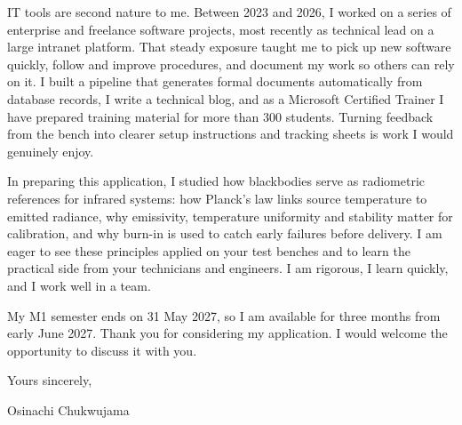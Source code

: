 \documentclass[11pt,a4paper]{article}
\begin{document}
IT tools are second nature to me. Between 2023 and 2026, I worked on a series of enterprise and freelance software projects, most recently as technical lead on a large intranet platform. That steady exposure taught me to pick up new software quickly, follow and improve procedures, and document my work so others can rely on it. I built a pipeline that generates formal documents automatically from database records, I write a technical blog, and as a Microsoft Certified Trainer I have prepared training material for more than 300 students. Turning feedback from the bench into clearer setup instructions and tracking sheets is work I would genuinely enjoy.

In preparing this application, I studied how blackbodies serve as radiometric references for infrared systems: how Planck's law links source temperature to emitted radiance, why emissivity, temperature uniformity and stability matter for calibration, and why burn-in is used to catch early failures before delivery. I am eager to see these principles applied on your test benches and to learn the practical side from your technicians and engineers. I am rigorous, I learn quickly, and I work well in a team.

My M1 semester ends on 31 May 2027, so I am available for three months from early June 2027. Thank you for considering my application. I would welcome the opportunity to discuss it with you.

Yours sincerely,

Osinachi Chukwujama
\end{document}
